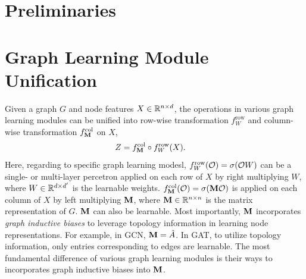 \documentclass{article} %
\begin{document}
\section{Preliminaries}

\section{Graph Learning Module Unification}

Given a graph $G$ and node features $X\in{\mathbb{R}}^{n\times d}$, the operations in various graph learning modules can be unified into row-wise transformation $f_W^{\mathrm{row}}$ and column-wise transformation $f_{{\mathbf{M}}}^{\mathrm{col}}$ on $X$,
\begin{equation}
	\label{equ:uni_grl}
	\begin{aligned}
		Z&=f_{{\mathbf{M}}}^{\mathrm{col}}\circ f_W^{\mathrm{row}}(X).
	\end{aligned}
\end{equation}
Here, regarding to specific graph learning modesl, $f_W^{\mathrm{row}}({\mathcal{O}})=\sigma({\mathcal{O}} W)$ can be a single- or multi-layer percetron applied on each row of $X$ by right multiplying $W$, where $W\in{\mathbb{R}}^{d\times d^{\prime}}$ is the learnable weights.
$f_{{\mathbf{M}}}^{\mathrm{col}}({\mathcal{O}})=\sigma({\mathbf{M}}{\mathcal{O}})$ is applied on each column of $X$ by left multiplying ${\mathbf{M}}$, where ${\mathbf{M}}\in{\mathbb{R}}^{n\times n}$ is the matrix representation of $G$.
${\mathbf{M}}$ can also be learnable.
Most importantly, ${\mathbf{M}}$ incorporates \emph{graph inductive biases} to leverage topology information in learning node representations.
For example, in GCN, ${\mathbf{M}}=\hat A$.
In GAT, to utilize topology information, only entries corresponding to edges are learnable.
The most fundamental difference of various graph learning modules is their ways to incorporates graph inductive biases into ${\mathbf{M}}$.
\end{document}
